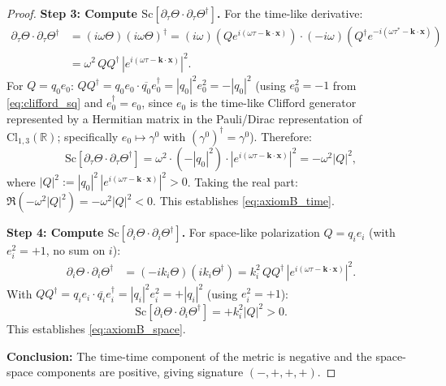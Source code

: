 \documentclass[12pt]{article}
\theoremstyle{definition}
\theoremstyle{remark}
\begin{document}
\begin{proof}
\textbf{Step 3: Compute $\mathrm{Sc}[\partial_\tau\Theta\cdot\partial_\tau\Theta^\dagger]$.}
For the time-like derivative:
\begin{align}
  \partial_\tau\Theta\cdot\partial_\tau\Theta^\dagger
  &= (i\omega\Theta)(i\omega\Theta)^\dagger
   = (i\omega)(Q e^{i(\omega\tau-\mathbf{k}\cdot\mathbf{x})})
     \cdot(-i\omega)(Q^\dagger e^{-i(\omega\tau^*-\mathbf{k}\cdot\mathbf{x})})
  \nonumber\\
  &= \omega^2\,Q Q^\dagger\,|e^{i(\omega\tau-\mathbf{k}\cdot\mathbf{x})}|^2.
\end{align}
For $Q = q_0 e_0$: $QQ^\dagger = q_0 e_0\cdot\overline{q_0}e_0^\dagger = |q_0|^2 e_0^2 = -|q_0|^2$
(using $e_0^2 = -1$ from \eqref{eq:clifford_sq} and $e_0^\dagger = e_0$, since $e_0$
is the time-like Clifford generator represented by a Hermitian matrix in the
Pauli/Dirac representation of $\mathrm{Cl}_{1,3}(\mathbb{R})$; specifically
$e_0 \mapsto \gamma^0$ with $(\gamma^0)^\dagger = \gamma^0$).
Therefore:
\begin{equation}
  \mathrm{Sc}[\partial_\tau\Theta\cdot\partial_\tau\Theta^\dagger]
  = \omega^2\cdot(-|q_0|^2)\cdot|e^{i(\omega\tau-\mathbf{k}\cdot\mathbf{x})}|^2
  = -\omega^2 |Q|^2,
\end{equation}
where $|Q|^2 := |q_0|^2\,|e^{i(\omega\tau-\mathbf{k}\cdot\mathbf{x})}|^2 > 0$.
Taking the real part: $\Re(-\omega^2|Q|^2) = -\omega^2|Q|^2 < 0$.
This establishes \eqref{eq:axiomB_time}.

\textbf{Step 4: Compute $\mathrm{Sc}[\partial_i\Theta\cdot\partial_i\Theta^\dagger]$.}
For space-like polarization $Q = q_i e_i$ (with $e_i^2 = +1$, no sum on $i$):
\begin{align}
  \partial_i\Theta\cdot\partial_i\Theta^\dagger
  &= (-ik_i\Theta)(ik_i\Theta^\dagger)
   = k_i^2\,Q Q^\dagger\,|e^{i(\omega\tau-\mathbf{k}\cdot\mathbf{x})}|^2.
\end{align}
With $QQ^\dagger = q_i e_i\cdot\overline{q_i}e_i^\dagger = |q_i|^2 e_i^2 = +|q_i|^2$
(using $e_i^2 = +1$):
\begin{equation}
  \mathrm{Sc}[\partial_i\Theta\cdot\partial_i\Theta^\dagger]
  = +k_i^2 |Q|^2 > 0.
\end{equation}
This establishes \eqref{eq:axiomB_space}.

\textbf{Conclusion:} The time-time component of the metric is negative and the
space-space components are positive, giving signature $(-,+,+,+)$.
\end{proof}
\end{document}
